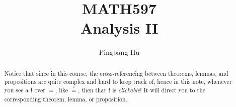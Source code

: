 \documentclass[a4paper]{article}
\author{Pingbang Hu}
\title{MATH597\\Analysis II}
\begin{document}
\maketitle
\begin{abstract}
	Notice that since in this course, the cross-referencing between theorems, lemmas, and propositions are quite complex and
	hard to keep track of, hence in this note, whenever you see a \textbf{!} over \(=\), like \(\overset{!}{=}\), then that
	\textbf{!} is \emph{clickable}! It will direct you to the corresponding theorem, lemma, or proposition.
\end{abstract}
\tableofcontents
{}
\end{document}
